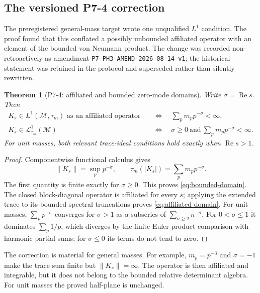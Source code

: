 \documentclass[11pt,a4paper]{article}
\newtheorem{theorem}{Theorem}[section]
\theoremstyle{definition}
\newcommand{\M}{\mathcal M}
\newcommand{\Lc}{\mathcal L}
\newcommand{\norm}[1]{\left\lVert #1\right\rVert}
\begin{document}
\subsection{The versioned P7-4 correction}

The preregistered general-mass target wrote one unqualified $L^1$ condition.
The proof found that this conflated a possibly unbounded affiliated operator
with an element of the bounded von Neumann product.  The change was recorded
non-retroactively as amendment \texttt{P7-PH3-AMEND-2026-08-14-v1}; the
historical statement was retained in the protocol and superseded rather than
silently rewritten.

\begin{theorem}[P7-4: affiliated and bounded zero-mode domains]
\label{thm:p74}
Write $\sigma=\operatorname{Re}s$.  Then
\begin{align}
 K_s\in L^1(\M,\tau_m)\text{ as an affiliated operator}
 &\quad\Longleftrightarrow\quad
 \sum_p m_pp^{-\sigma}<\infty,
 \label{eq:affiliated-domain}\\
 K_s\in\Lc^1_{\tau_m}(\M)
 &\quad\Longleftrightarrow\quad
 \sigma\geq0\ \text{and}\
 \sum_p m_pp^{-\sigma}<\infty.
 \label{eq:bounded-domain}
\end{align}
For unit masses, both relevant trace-ideal conditions hold exactly when
$\operatorname{Re}s>1$.
\end{theorem}

\begin{proof}
Componentwise functional calculus gives
\begin{equation}
 \norm{K_s}=\sup_p p^{-\sigma},
 \qquad
 \tau_m(|K_s|)=\sum_p m_pp^{-\sigma}.
 \label{eq:Ks-norms}
\end{equation}
The first quantity is finite exactly for $\sigma\geq0$.  This proves
\eqref{eq:bounded-domain}.  The closed block-diagonal operator is affiliated
for every $s$; applying the extended trace to its bounded spectral
truncations proves \eqref{eq:affiliated-domain}.  For unit masses,
$\sum_p p^{-\sigma}$ converges for $\sigma>1$ as a subseries of
$\sum_{n\geq2}n^{-\sigma}$.  For $0<\sigma\leq1$ it dominates
$\sum_p1/p$, which diverges by the finite Euler-product comparison with
harmonic partial sums; for $\sigma\leq0$ its terms do not tend to zero.
\end{proof}

The correction is material for general masses.  For example,
$m_p=p^{-3}$ and $\sigma=-1$ make the trace sum finite but
$\norm{K_s}=\infty$.  The operator is then affiliated and integrable, but it
does not belong to the bounded relative determinant algebra.  For unit masses
the proved half-plane is unchanged.
\end{document}
